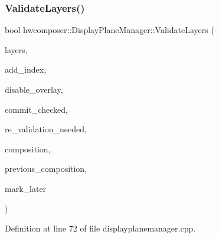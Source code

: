 \subsubsection{\texorpdfstring{Validate\+Layers()}{ValidateLayers()}}
{\footnotesize\ttfamily bool hwcomposer\+::\+Display\+Plane\+Manager\+::\+Validate\+Layers (\begin{DoxyParamCaption}\item[{std\+::vector$<$ \mbox{\hyperlink{structhwcomposer_1_1OverlayLayer}{Overlay\+Layer}} $>$ \&}]{layers,  }\item[{int}]{add\+\_\+index,  }\item[{bool}]{disable\+\_\+overlay,  }\item[{bool $\ast$}]{commit\+\_\+checked,  }\item[{bool $\ast$}]{re\+\_\+validation\+\_\+needed,  }\item[{\mbox{\hyperlink{namespacehwcomposer_adf383ae435d39a5631a8ad82e7fa18a4}{Display\+Plane\+State\+List}} \&}]{composition,  }\item[{\mbox{\hyperlink{namespacehwcomposer_adf383ae435d39a5631a8ad82e7fa18a4}{Display\+Plane\+State\+List}} \&}]{previous\+\_\+composition,  }\item[{std\+::vector$<$ \mbox{\hyperlink{classhwcomposer_1_1NativeSurface}{Native\+Surface}} $\ast$$>$ \&}]{mark\+\_\+later }\end{DoxyParamCaption})}



Definition at line 72 of file displayplanemanager.\+cpp.


